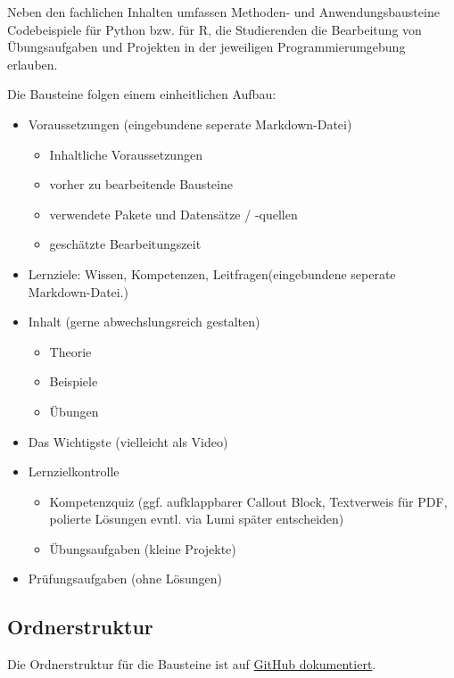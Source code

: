 \documentclass[
  letterpaper,
  DIV=11]{scrartcl}
\begin{document}
Neben den fachlichen Inhalten umfassen Methoden- und Anwendungsbausteine
Codebeispiele für Python bzw. für R, die Studierenden die Bearbeitung
von Übungsaufgaben und Projekten in der jeweiligen Programmierumgebung
erlauben.

Die Bausteine folgen einem einheitlichen Aufbau:

\begin{itemize}
\item
  Voraussetzungen (eingebundene seperate Markdown-Datei)

  \begin{itemize}
  \item
    Inhaltliche Voraussetzungen
  \item
    vorher zu bearbeitende Bausteine
  \item
    verwendete Pakete und Datensätze / -quellen
  \item
    geschätzte Bearbeitungszeit
  \end{itemize}
\item
  Lernziele: Wissen, Kompetenzen, Leitfragen(eingebundene seperate
  Markdown-Datei.)
\item
  Inhalt (gerne abwechslungsreich gestalten)

  \begin{itemize}
  \item
    Theorie
  \item
    Beispiele
  \item
    Übungen
  \end{itemize}
\item
  Das Wichtigste (vielleicht als Video)
\item
  Lernzielkontrolle

  \begin{itemize}
  \item
    Kompetenzquiz (ggf. aufklappbarer Callout Block, Textverweis für
    PDF, polierte Lösungen evntl. via Lumi später entscheiden)
  \item
    Übungsaufgaben (kleine Projekte)
  \end{itemize}
\item
  Prüfungsaufgaben (ohne Lösungen)
\end{itemize}

\subsection{Ordnerstruktur}\label{ordnerstruktur}

Die Ordnerstruktur für die Bausteine ist auf
\href{https://bausteine-der-datenanalyse.github.io/bcd-dokumentation/organisation.html}{GitHub
dokumentiert}.
\end{document}
